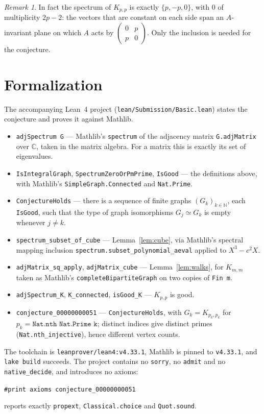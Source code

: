 \documentclass[11pt]{article}
\theoremstyle{plain}
\theoremstyle{definition}
\theoremstyle{remark}
\newtheorem{remark}[theorem]{Remark}
\begin{document}
\begin{remark}
In fact the spectrum of $K_{p,p}$ is exactly $\{p,-p,0\}$, with $0$ of
multiplicity $2p-2$: the vectors that are constant on each side span an
$A$-invariant plane on which $A$ acts by
$\left(\begin{smallmatrix}0&p\\p&0\end{smallmatrix}\right)$. Only the inclusion
is needed for the conjecture.
\end{remark}

\section{Formalization}

The accompanying Lean~4 project (\texttt{lean/Submission/Basic.lean}) states
the conjecture and proves it against Mathlib.

\begin{itemize}
  \item \texttt{adjSpectrum G} --- Mathlib's \texttt{spectrum} of the adjacency
    matrix \texttt{G.adjMatrix} over $\mathbb C$, taken in the matrix algebra.
    For a matrix this is exactly its set of eigenvalues.
  \item \texttt{IsIntegralGraph}, \texttt{SpectrumZeroOrPmPrime},
    \texttt{IsGood} --- the definitions above, with Mathlib's
    \texttt{SimpleGraph.Connected} and \texttt{Nat.Prime}.
  \item \texttt{ConjectureHolds} --- there is a sequence of finite graphs
    $(G_k)_{k\in\mathbb N}$, each \texttt{IsGood}, such that the type of graph
    isomorphisms $G_j\simeq G_k$ is empty whenever $j\ne k$.
  \item \texttt{spectrum\_subset\_of\_cube} --- Lemma~\ref{lem:cube}, via
    Mathlib's spectral mapping inclusion
    \texttt{spectrum.subset\_polynomial\_aeval} applied to $X^3-c^2X$.
  \item \texttt{adjMatrix\_sq\_apply}, \texttt{adjMatrix\_cube} ---
    Lemma~\ref{lem:walks}, for $K_{m,m}$ taken as Mathlib's
    \texttt{completeBipartiteGraph} on two copies of \texttt{Fin m}.
  \item \texttt{adjSpectrum\_K}, \texttt{K\_connected}, \texttt{isGood\_K} ---
    $K_{p,p}$ is good.
  \item \texttt{conjecture\_00000000051} --- \texttt{ConjectureHolds}, with
    $G_k=K_{p_k,p_k}$ for $p_k=\texttt{Nat.nth Nat.Prime k}$; distinct indices
    give distinct primes (\texttt{Nat.nth\_injective}), hence different vertex
    counts.
\end{itemize}

The toolchain is \texttt{leanprover/lean4:v4.33.1}, Mathlib is pinned to
\texttt{v4.33.1}, and \texttt{lake build} succeeds. The project contains no
\texttt{sorry}, no \texttt{admit} and no \texttt{native\_decide}, and
introduces no axioms:
\begin{center}
\texttt{\#print axioms conjecture\_00000000051}
\end{center}
reports exactly \texttt{propext}, \texttt{Classical.choice} and
\texttt{Quot.sound}.
\end{document}
